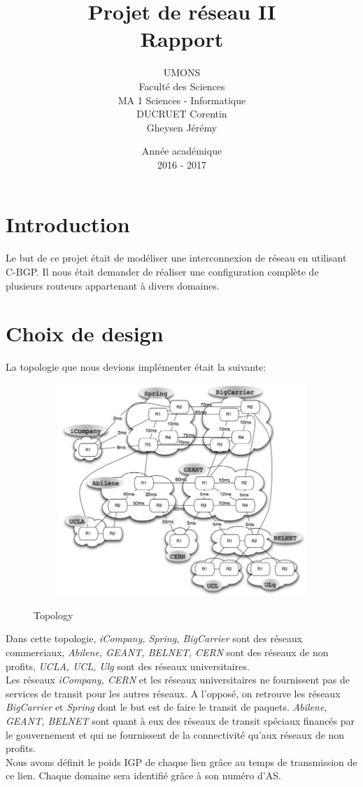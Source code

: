 \documentclass[a4paper,12pt]{report} %
\title{Projet de réseau II\\Rapport}
\author{UMONS\\Faculté des Sciences\\MA 1 Sciences - Informatique\\DUCRUET Corentin \\Gheysen Jérémy}}
\date{Année académique\\2016 - 2017}
\begin{document}
 
\maketitle
\newpage 
\tableofcontents 
\newpage
\raggedright

\section{Introduction}
Le but de ce projet était de modéliser une interconnexion de réseau en utilisant C-BGP. Il nous était demander de réaliser une configuration complète de plusieurs routeurs appartenant à divers domaines.

\section{Choix de design}
La topologie que nous devions implémenter était la suivante:
\begin{figure}[!h] %
		\centering
		\includegraphics[width=120mm,height=80mm]{topologie}
		\label{topo}
		\caption{Topology}
	\end{figure} 

Dans cette topologie, \textit{iCompany, Spring, BigCarrier} sont des réseaux commerciaux,  \textit{Abilene, GEANT, BELNET, CERN} sont des réseaux de non profits, \textit{UCLA, UCL, Ulg} sont des réseaux universitaires.\\
Les réseaux \textit{iCompany, CERN} et les réseaux universitaires ne fournissent pas de services de transit pour les autres réseaux. A l'opposé, on retrouve les réseaux \textit{BigCarrier} et \textit{Spring} dont le but est de faire le transit de paquets. \textit{Abilene, GEANT, BELNET} sont quant à eux des réseaux de transit spéciaux financés par le gouvernement et qui ne fournissent de la connectivité qu'aux réseaux  de non profits.\\
Nous avons définit le poids IGP de chaque lien grâce au temps de transmission de ce lien. Chaque domaine sera identifié grâce à son numéro d'AS.\\
\end{document}
